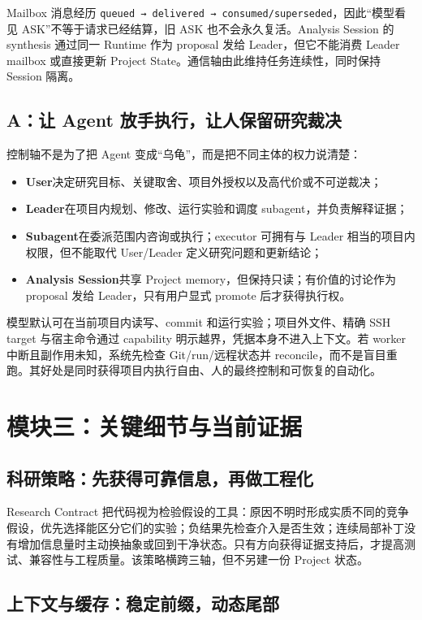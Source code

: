 \documentclass[UTF8,11pt,a4paper,fontset=fandol]{ctexart}
\newcommand{\code}[1]{\texttt{#1}}
\newcommand{\term}[1]{\textbf{#1}}
\begin{document}
Mailbox 消息经历 \code{queued → delivered → consumed/superseded}，因此“模型看见 ASK”不等于请求已经结算，旧 ASK 也不会永久复活。Analysis Session 的 synthesis 通过同一 Runtime 作为 proposal 发给 Leader，但它不能消费 Leader mailbox 或直接更新 Project State。通信轴由此维持任务连续性，同时保持 Session 隔离。
\subsection{A：让 Agent 放手执行，让人保留研究裁决}

控制轴不是为了把 Agent 变成“乌龟”，而是把不同主体的权力说清楚：

\begin{itemize}
  \item \term{User}决定研究目标、关键取舍、项目外授权以及高代价或不可逆裁决；
  \item \term{Leader}在项目内规划、修改、运行实验和调度 subagent，并负责解释证据；
  \item \term{Subagent}在委派范围内咨询或执行；executor 可拥有与 Leader 相当的项目内权限，但不能取代 User/Leader 定义研究问题和更新结论；
  \item \term{Analysis Session}共享 Project memory，但保持只读；有价值的讨论作为 proposal 发给 Leader，只有用户显式 promote 后才获得执行权。
\end{itemize}

模型默认可在当前项目内读写、commit 和运行实验；项目外文件、精确 SSH target 与宿主命令通过 capability 明示越界，凭据本身不进入上下文。若 worker 中断且副作用未知，系统先检查 Git/run/远程状态并 reconcile，而不是盲目重跑。其好处是同时获得项目内执行自由、人的最终控制和可恢复的自动化。

\section{模块三：关键细节与当前证据}

\subsection{科研策略：先获得可靠信息，再做工程化}

Research Contract 把代码视为检验假设的工具：原因不明时形成实质不同的竞争假设，优先选择能区分它们的实验；负结果先检查介入是否生效；连续局部补丁没有增加信息量时主动换抽象或回到干净状态。只有方向获得证据支持后，才提高测试、兼容性与工程质量。该策略横跨三轴，但不另建一份 Project 状态。

\subsection{上下文与缓存：稳定前缀，动态尾部}
\end{document}
